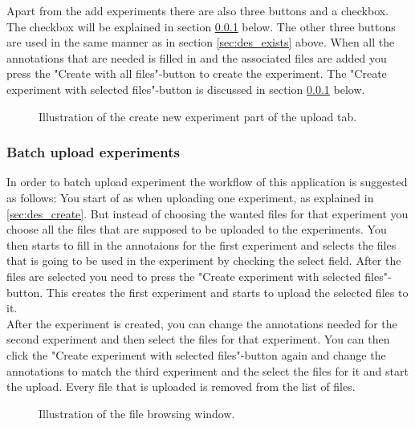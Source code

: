  Apart from the add experiments there are also three buttons and a checkbox. The checkbox will be explained in section \ref{sec:des_batch} below. The other three buttons are used in the same manner as in section \ref{sec:des_exists} above. When all the annotations that are needed is filled in and the associated files are added you press the "Create with all files"-button to create the experiment. The "Create experiment with selected files"-button is discussed in section \ref{sec:des_batch} below. \\

\begin{figure}[h]
	\caption{Illustration of the create new experiment part of the upload tab.}
	\label{fig:des_upload-new}
\end{figure}
\subsubsection{Batch upload experiments}
\label{sec:des_batch}
In order to batch upload experiment the workflow of this application is suggested as follows:
You start of as when uploading one experiment, as explained in \ref{sec:des_create}. But instead of choosing the wanted files for that experiment you choose all the files that are supposed to be uploaded to the experiments. You then starts to fill in the annotaions for the first experiment and selects the files that is going to be used in the experiment by checking the select field. After the files are selected you need to press the "Create experiment with selected files"-button. This creates the first experiment and starts to upload the selected files to it. \\

After the experiment is created, you can change the annotations needed for the second experiment and then select the files for that experiment. You can then click the "Create experiment with selected files"-button again and change the annotations to match the third experiment and the select the files for it and start the upload. Every file that is uploaded is removed from the list of files. 

\begin{figure}[h]
	\caption{Illustration of the file browsing window.}
	\label{fig:des_upload}
\end{figure}
\FloatBarrier

